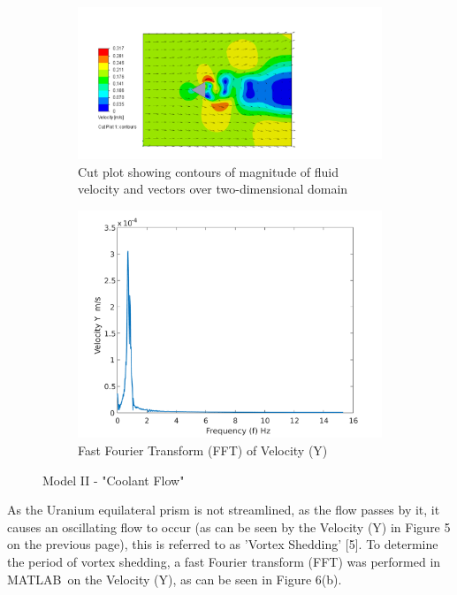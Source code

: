 \documentclass[a4paper,11pt,onecolumn]{article}
\begin{document}
\begin{figure}
\centering
\begin{subfigure}{.49\textwidth}
  \centering
  \includegraphics[width=1.7\linewidth]{q14.pdf}
  \caption{Cut plot showing contours of magnitude of fluid velocity and
vectors over two-dimensional domain}
\label{fig:q14}
\end{subfigure}
\begin{subfigure}{.49\textwidth}
  \centering
  \includegraphics[width=\linewidth]{q17.pdf}
  \caption{Fast Fourier Transform (FFT) of Velocity (Y)}
  \label{fig:q17}
\end{subfigure}
\caption{Model II - "Coolant Flow"}
\end{figure}

As the Uranium equilateral prism is not streamlined, as the flow passes by it,
it causes an oscillating flow to occur (as can be seen by the Velocity (Y) in
Figure 5 on the previous page), this is referred to as 'Vortex Shedding' [5].
To determine the period of vortex shedding, a fast Fourier transform (FFT) was
performed in MATLAB\textregistered~on the Velocity (Y), as can be seen in
Figure 6(b).
\end{document}
